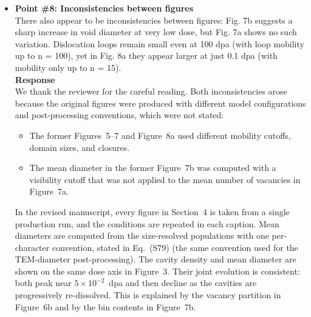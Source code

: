 \documentclass{article}
\newif\ifshowauthornotes
\newcommand{\authornote}[1]{\ifshowauthornotes{\color{red}\ [\textbf{Author action:} #1]}\fi}
\begin{document}
\begin{itemize}
\authornote{The Abstract (``the computed densities and mean diameters \ldots\ fall within the measured ranges'') and Conclusion (i) (``all six lie inside the ranges'') contradict Table~2 and Section~4.1, which state that the cavity density ($3.61\times10^{20}$ vs.\ 11--14$\times10^{20}$~m$^{-3}$) is outside the measured band. Align the Abstract and Conclusions with ``five of six, all within a factor of three'' before resubmission; Reviewers \#2 and \#4 will check this.}

\item \textbf{Point \#8: Inconsistencies between figures}\\
There also appear to be inconsistencies between figures: Fig. 7b suggests a sharp increase in void diameter at very low dose, but Fig. 7a shows no such variation. Dislocation loops remain small even at 100 dpa (with loop mobility up to n = 100), yet in Fig. 8a they appear larger at just 0.1 dpa (with mobility only up to n = 15).\\

\textbf{Response}\\
We thank the reviewer for the careful reading. Both inconsistencies arose because the original figures were produced with different model configurations and post-processing conventions, which were not stated:
\begin{itemize}
    \item The former Figures~5--7 and Figure~8a used different mobility cutoffs, domain sizes, and closures.
    \item The mean diameter in the former Figure~7b was computed with a visibility cutoff that was not applied to the mean number of vacancies in Figure~7a.
\end{itemize}

\authornote{Confirm the specific cause for each of the two inconsistencies and adjust the sentences above.}

In the revised manuscript, every figure in Section~4 is taken from a single production run, and the conditions are repeated in each caption. Mean diameters are computed from the size-resolved populations with one per-character convention, stated in Eq.~(S79) (the same convention used for the TEM-diameter post-processing). The cavity density and mean diameter are shown on the same dose axis in Figure~3. Their joint evolution is consistent: both peak near $5\times10^{-2}$~dpa and then decline as the cavities are progressively re-dissolved. This is explained by the vacancy partition in Figure~6b and by the bin contents in Figure~7b.


\end{itemize}
\end{document}
